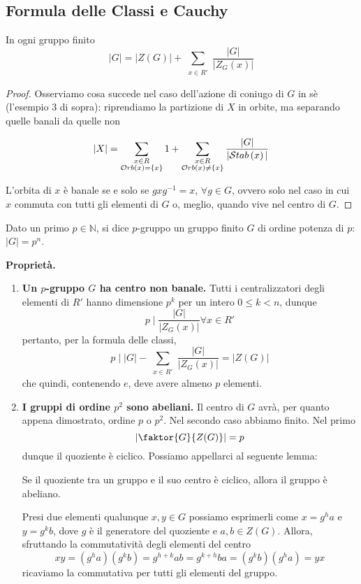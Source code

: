 \subsection{Formula delle Classi e Cauchy}
\begin{multicols}{2}

\begin{theorem}
	In ogni gruppo finito
	\[ |G| = |Z(G)| + \sum_{\substack{x \in R'}} \frac{|G|}{|Z_G(x)|} \]
\end{theorem}
\begin{proof}
	Osserviamo cosa succede nel caso dell'azione di coniugo di $ G $ in sè (l'esempio 3 di sopra): riprendiamo la partizione di $ X $ in orbite, ma separando quelle banali da quelle non
	
	\[ |X| = \sum_{\substack{x \in R \\ \mathcal{O}rb\left( x \right) = \{x\} }} 1 + \sum_{\substack{x \in R \\ \mathcal{O}rb\left( x \right) \neq \{x\} }} \frac{|G|}{|\mathcal{S}tab\left( x \right)|} \]
	
	L'orbita di $ x $ è banale se e solo se $ gxg^{-1} = x $, $ \forall g \in G $, ovvero solo nel caso in cui $ x $ commuta con tutti gli elementi di $ G $ o, meglio, quando vive nel centro di $ G $.
\end{proof}

\begin{definition}[$ p $-gruppo]
	Dato un primo $ p \in \mathbb{N} $, si dice $ p $-gruppo un gruppo finito $ G $ di ordine potenza di $ p $: $ |G| = p^n $.
\end{definition}

\textbf{Proprietà.}
\begin{enumerate}
	\item \textbf{Un $ p $-gruppo $ G $ ha centro non banale.} Tutti i centralizzatori degli elementi di $ R' $ hanno dimensione $ p^k $ per un intero $ 0 \leq k < n $, dunque
	\[ p \mid \frac{|G|}{|Z_G(x)|} \forall x \in R' \]
	pertanto, per la formula delle classi,
	\[ p \mid |G| - \sum_{\substack{x \in R'}} \frac{|G|}{|Z_G(x)|} = |Z(G)| \]
	che quindi, contenendo $ e $, deve avere almeno $ p $ elementi.
	
	\item \textbf{I gruppi di ordine $ p^2 $ sono abeliani.} Il centro di $ G $ avrà, per quanto appena dimostrato, ordine $ p $ o $ p^2 $. Nel secondo caso abbiamo finito. Nel primo \[  \left|\faktor{G}{Z(G)}\right| = p \] dunque il quoziente è ciclico. Possiamo appellarci al seguente lemma:
	\begin{prop}
		Se il quoziente tra un gruppo e il suo centro è ciclico, allora il gruppo è abeliano.
	\end{prop}
	Presi due elementi qualunque $ x, y \in G $ possiamo esprimerli come $ x = g^h a $ e $ y = g^k b $, dove $ g $ è il generatore del quoziente e $ a, b \in Z(G) $. Allora, sfruttando la commutatività degli elementi del centro \[ xy = (g^h a) (g^k b) = g^{h+k} ab = g^{k+h} ba = (g^k b) (g^h a) = yx \]
	ricaviamo la commutativa per tutti gli elementi del gruppo.
	

\end{enumerate}
\end{multicols}
